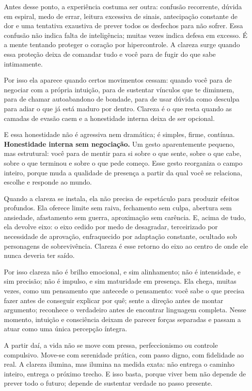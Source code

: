 \documentclass[12pt]{book}
\begin{document}
Antes desse ponto, a experiência costuma ser outra: confusão recorrente, dúvida em espiral, medo de errar, leitura excessiva de sinais, antecipação constante de dor e uma tentativa exaustiva de prever todos os desfechos para não sofrer. Essa confusão não indica falta de inteligência; muitas vezes indica defesa em excesso. É a mente tentando proteger o coração por hipercontrole. A clareza surge quando essa proteção deixa de comandar tudo e você para de fugir do que sabe intimamente.

Por isso ela aparece quando certos movimentos cessam: quando você para de negociar com a própria intuição, para de sustentar vínculos que te diminuem, para de chamar autoabandono de bondade, para de usar dúvida como desculpa para adiar o que já está maduro por dentro. Clareza é o que resta quando as camadas de evasão caem e a honestidade interna deixa de ser opcional.

E essa honestidade não é agressiva nem dramática; é simples, firme, contínua. \textbf{Honestidade interna sem negociação.} Um gesto aparentemente pequeno, mas estrutural: você para de mentir para si sobre o que sente, sobre o que cabe, sobre o que terminou e sobre o que pede começo. Esse gesto reorganiza o campo inteiro, porque muda a qualidade de presença a partir da qual você se relaciona, escolhe e responde ao mundo.

Quando a clareza se instala, ela não precisa de espetáculo para produzir efeitos profundos. Ela oferece limite sem raiva, fechamento sem culpa, abertura sem ansiedade, afastamento sem guerra, aproximação sem carência. E, acima de tudo, ela devolve eixo: o eixo cedido por medo de desagradar, terceirizado por necessidade de aprovação, enfraquecido por adaptação constante, ocultado sob personagens de sobrevivência. Clareza é esse retorno do eixo ao centro de onde ele nunca deveria ter saído.

Por isso clareza não é brilho emocional, e sim alinhamento; não é intensidade, e sim precisão; não é impulso, e sim maturidade em presença. Ela chega, muitas vezes, como um pensamento que antecede o pensamento: você sabe o que precisa fazer antes de conseguir explicar por quê; sente a direção antes de montar argumento; reconhece o verdadeiro antes de encontrar linguagem completa. Nesse momento, intuição e consciência deixam de parecer forças separadas e passam a atuar como uma única percepção íntegra.

A partir daí, a vida não se move com pressa, perfeccionismo ou controle compulsivo. Move-se com serenidade prática, com passo digno, com fidelidade ao real. A clareza ilumina, mas ilumina na medida exata: não entrega o caminho inteiro, entrega o próximo trecho. E isso basta, porque viver bem não depende de prever todo o futuro; depende de sustentar verdade no passo presente.
\end{document}
